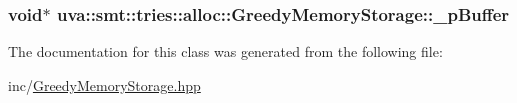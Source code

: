 \subsubsection[{\+\_\+p\+Buffer}]{\setlength{\rightskip}{0pt plus 5cm}void$\ast$ uva\+::smt\+::tries\+::alloc\+::\+Greedy\+Memory\+Storage\+::\+\_\+p\+Buffer\hspace{0.3cm}{\ttfamily [protected]}}\label{classuva_1_1smt_1_1tries_1_1alloc_1_1_greedy_memory_storage_a1c8ad9025dcdf7c396b72cb06a67662a}


The documentation for this class was generated from the following file\+:\begin{DoxyCompactItemize}
\item 
inc/\hyperlink{_greedy_memory_storage_8hpp}{Greedy\+Memory\+Storage.\+hpp}\end{DoxyCompactItemize}
